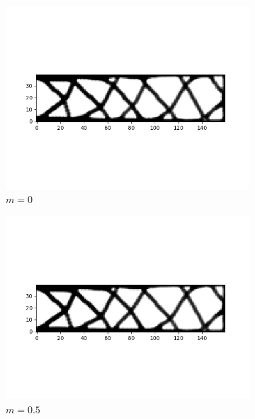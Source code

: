       \begin{figure}
        \begin{subfigure}[t]{0.45\textwidth}
          \centering
          \includegraphics[width=1\textwidth]{./images/robust_exact/exact_svd_mean_0std_csimp.png}
          \caption{$m = 0$}
        \end{subfigure}
        \begin{subfigure}[t]{0.45\textwidth}
          \centering
          \includegraphics[width=1\textwidth]{./images/robust_exact/exact_svd_mean_5std_csimp.png}
          \caption{$m = 0.5$}
        \end{subfigure}
        \begin{subfigure}[t]{0.45\textwidth}

\end{subfigure}
\end{figure}
